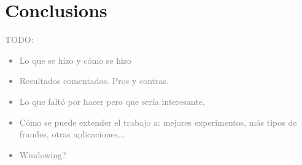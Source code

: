 
\section{Conclusions}

\textcolor{gray}{TODO: 
\begin{itemize}
    \item Lo que se hizo y cómo se hizo
    \item Resultados comentados. Pros y contras.
    \item Lo que faltó por hacer pero que sería interesante.
    \item Cómo se puede extender el trabajo a: mejores experimentos, más tipos de fraudes, otras aplicaciones...
    \item Windowing?
\end{itemize}
}